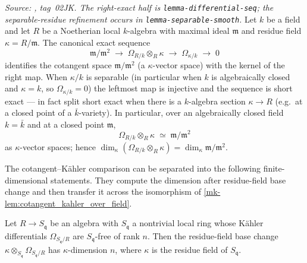 \begin{lemma}
  \label{mk-lem:cotangent_kahler_over_field}

  \textit{Source: \cite{stacks-project}, tag~02JK. The right-exact half is
  \texttt{lemma-differential-seq}; the separable-residue refinement occurs in
  \texttt{lemma-separable-smooth}.}
  Let \(k\) be a field and let \(R\) be a Noetherian local
  \(k\)-algebra with maximal ideal \(\mathfrak m\) and residue field
  \(\kappa = R/\mathfrak m\). The canonical exact sequence
  \[
    \mathfrak m / \mathfrak m^2
    \;\longrightarrow\; \Omega_{R/k} \otimes_R \kappa
    \;\longrightarrow\; \Omega_{\kappa / k}
    \;\longrightarrow\; 0
  \]
  identifies the cotangent space \(\mathfrak m / \mathfrak m^2\) (a
  \(\kappa\)-vector space) with the kernel of the right map. When
  \(\kappa / k\) is separable (in particular when \(k\) is
  algebraically closed and \(\kappa = k\), so \(\Omega_{\kappa / k}
  = 0\)) the leftmost map is injective and the sequence is short exact
  --- in fact split short exact when there is a \(k\)-algebra section
  \(\kappa \to R\) (e.g.\ at a closed point of a \(\bar k\)-variety).
  In particular, over an algebraically closed field \(k = \bar k\) and
  at a closed point \(\mathfrak m\),
  \[
    \Omega_{R/k} \otimes_R \kappa \;\simeq\; \mathfrak m / \mathfrak m^2
  \]
  as \(\kappa\)-vector spaces; hence
  \(\dim_\kappa(\Omega_{R/k} \otimes_R \kappa)
   = \dim_\kappa \mathfrak m / \mathfrak m^2\).
\end{lemma}

The cotangent--K\"ahler comparison can be separated into the following
finite-dimensional statements.  They compute the dimension after residue-field
base change and then transfer it across the isomorphism of
\ref{mk-lem:cotangent_kahler_over_field}.

\begin{lemma}\label{mk-lem:finrank_residue_kaehler_of_free_rank}
  \leanok

  Let \(R \to S_{\mathfrak q}\) be an algebra with \(S_{\mathfrak q}\) a nontrivial
  local ring whose K\"ahler differentials \(\Omega_{S_{\mathfrak q}/R}\) are
  \(S_{\mathfrak q}\)-free of rank \(n\). Then the residue-field base change
  \(\kappa \otimes_{S_{\mathfrak q}} \Omega_{S_{\mathfrak q}/R}\) has
  \(\kappa\)-dimension \(n\), where \(\kappa\) is the residue field of \(S_{\mathfrak q}\).
\end{lemma}

